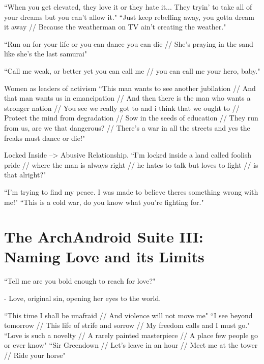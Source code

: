 \documentclass[a4paper, 11pt]{article} %
\begin{document}
``When you get elevated, they love it or they hate it... They tryin' to take all of your dreams but you can't allow it."\cite{danceordie}
``Just keep rebelling away, you gotta dream it away // Because the weatherman on TV ain't creating the weather."\cite{danceordie}

``Run on for your life or you can dance you can die // She's praying in the sand like she's the last samurai"\cite{danceordie}

``Call me weak, or better yet you can call me // you can call me your hero, baby."\cite{faster}

Women as leaders of activism
``This man wants to see another jubilation //
And that man wants us in emancipation //
And then there is the man who wants a stronger nation //
You see we really got to and i think that we ought to //
Protect the mind from degradation //
Sow in the seeds of education //
They run from us, are we that dangerous? //
There's a war in all the streets and yes the freaks must dance or die!"\cite{danceordie}

Locked Inside --> Abusive Relationship.
``I'm locked inside a land called foolish pride // where the man is always right // he hates to talk but loves to fight // is that alright?"\cite{lockedinside}

``I'm trying to find my peace.  I was made to believe theres something wrong with me!"\cite{coldwar}
``This is a cold war, do you know what you're fighting for."\cite{coldwar}




\section*{The ArchAndroid Suite III: Naming Love and its Limits}

``Tell me are you bold enough to reach for love?"\cite{manymoons}

- Love, original sin, opening her eyes to the world.

``This time I shall be unafraid // And violence will not move me"\cite{babopbyeya}
``I see beyond tomorrow // This life of strife and sorrow // My freedom calls and I must go."\cite{babopbyeya}
``Love is such a novelty // A rarely painted masterpiece // A place few people go or ever know"\cite{sayyouwillgo}
``Sir Greendown // Let's leave in an hour // Meet me at the tower // Ride your horse"\cite{greendown}

\end{document}
